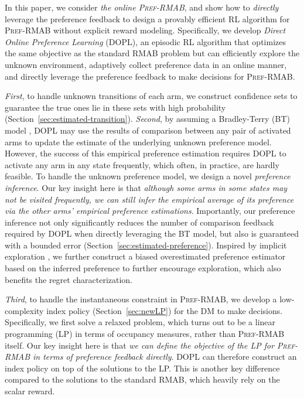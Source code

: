 \documentclass{article} %
\newcommand{\RMABPF}{\textsc{Pref-RMAB}\xspace}
\newcommand{\DOPL}{\textsc{DOPL}\xspace}
\begin{document}
In this paper, we consider \textit{the online \RMABPF}, and show how to \textit{directly} leverage the preference feedback to design a provably efficient RL algorithm for \RMABPF without explicit reward modeling. {Specifically, we develop \textit{Direct Online Preference Learning} (\DOPL), an episodic RL algorithm that optimizes the same objective as the standard RMAB problem but can efficiently explore the unknown environment, adaptively collect preference data in an online manner, and directly leverage the preference feedback to make decisions for \RMABPF. }

\textit{First}, to handle unknown transitions of each arm, we construct confidence sets to guarantee the true ones lie in these sets with high probability (Section~\ref{sec:estimated-transition}). \textit{Second}, by assuming a Bradley-Terry (BT) model \citep{bradley1952rank}, \DOPL may use the results of comparison between any pair of activated arms to update the estimate of the underlying unknown preference model. However, the success of this empirical preference estimation requires \DOPL to activate any arm in any state frequently, which often, in practice, are hardly feasible. To handle the unknown preference model, we design a novel \textit{preference inference}. Our key insight here is that \textit{although some arms in some states may not be visited frequently, we can still infer the empirical average of its preference via the other arms' empirical preference estimations}. Importantly, our preference inference not only significantly reduces the number of comparison feedback required by \DOPL when directly leveraging the BT model, but also is guaranteed with a bounded error  (Section~\ref{sec:estimated-preference}). Inspired by implicit exploration \citep{jin2020provably}, we further construct a biased overestimated preference estimator based on the inferred preference to further encourage exploration, which also benefits the regret characterization. 

\textit{Third}, to handle the instantaneous constraint in \RMABPF, we develop a low-complexity index policy (Section~\ref{sec:newLP}) for the DM to make decisions. {Specifically, we first solve a relaxed problem, which turns out to be a linear programming (LP) in terms of occupancy measures, rather than \RMABPF itself. Our key insight here is that \textit{we can define the objective of the LP for \RMABPF in terms of preference feedback directly}. \DOPL can therefore construct an index policy on top of the solutions to the LP. This is another key difference compared to the solutions \citep{whittle1988restless,larranaga2014index,bagheri2015restless,verloop2016asymptotically, zhang2021restless} to the standard RMAB, which heavily rely on the scalar reward. }
\end{document}
